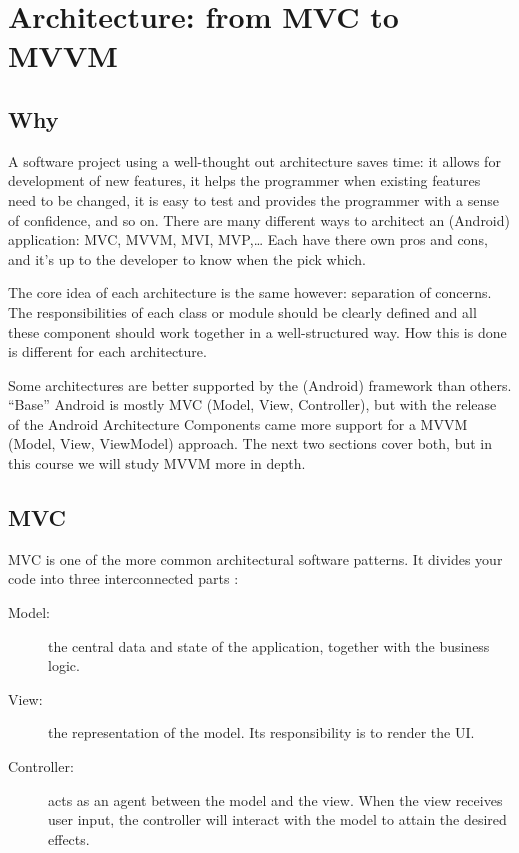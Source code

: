 

\chapter{Architecture: from MVC to MVVM}
\label{cap:mvvm}
\section{Why}
A software project using a well-thought out architecture saves time: it allows for development of new features, it helps the programmer when existing features need to be changed, it is easy to test and provides the programmer with a sense of confidence, and so on. 
There are many different ways to architect an (Android) application: MVC, MVVM, MVI, MVP,\ldots 
Each have there own pros and cons, and it's up to the developer to know when the pick which.

The core idea of each architecture is the same however: separation of concerns.
The responsibilities of each class or module should be clearly defined and all these component should work together in a well-structured way. 
How this is done is different for each architecture. 

Some architectures are better supported by the (Android) framework than others. 
``Base'' Android is mostly MVC (Model, View, Controller), but with the release of the Android Architecture Components came more support for a MVVM (Model, View, ViewModel) approach.
The next two sections cover both, but in this course we will study MVVM more in depth. 



\section{MVC}
MVC is one of the more common architectural software patterns.
It divides your code into three interconnected parts \cite{mvc-mvp-mvv-on-android}:

\begin{description}
	\item[Model:] the central data and state of the application, together with the business logic.
	\item[View:] the representation of the model. Its responsibility is to render the UI.
	\item[Controller:] acts as an agent between the model and the view. 
		When the view receives user input, the controller will interact with the model to attain the desired effects.
\end{description}

